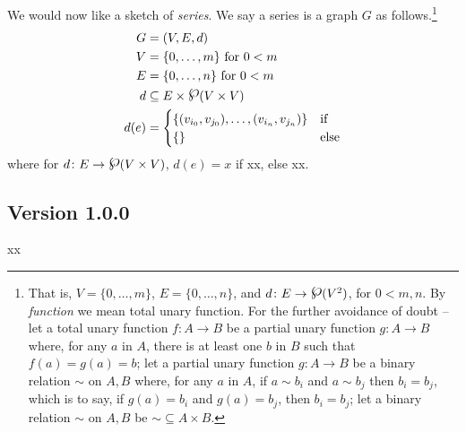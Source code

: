 \documentclass{amsart}%
\newcommand{\mention}[1]{\textit{#1}}%
\newcommand{\simset}{\mathord\sim}%
\newcommand{\powerset}{\raisebox{.15\baselineskip}{\Large\ensuremath{\wp}}}%
\theoremstyle{plain}
\theoremstyle{definition}
\theoremstyle{remark}
\theoremstyle{definition}
\theoremstyle{remark}
\begin{document}
We would now like a sketch of \mention{series}. We say a series is a graph \(G\) as follows.\footnote{That is, \(V=\{0,\ldots,m\}\), \(E=\{0,\ldots,n\}\), and \(d\colon E\to\powerset(V^2)\), for \(0<m,n\). By \mention{function} we mean total unary function. For the further avoidance of doubt -- let a total unary function \(f\colon A\to B\) be a partial unary function \(g\colon A\to B\) where, for any \(a\) in \(A\), there is at least one \(b\) in \(B\) such that \(f(a)=g(a)=b\); let a partial unary function \(g\colon A\to B\) be a binary relation \(\sim\) on \(A,B\) where, for any \(a\) in \(A\), if \(a\sim b_i\) and \(a\sim b_j\) then \(b_i=b_j\), which is to say, if \(g(a)=b_i\) and \(g(a)=b_j\), then \(b_i=b_j\); let a binary relation \(\sim\) on \(A,B\) be \(\simset\subseteq A\times B\).}
\begin{align*}
G &= (V, E, d)\\%
V &= \{0,\ldots,m\}\text{ for } 0<m\\
E &= \{0,\ldots,n\}\text{ for } 0<m\\
d &\subseteq E\times\powerset(V\times V)\\
d(e) &=\begin{cases}
\{(v_{i_0},v_{j_0}),\ldots,(v_{i_n},v_{j_n})\} & \text{if}\\
\{\} & \text{else}
\end{cases}
\end{align*}
where for \(d\colon E\to\powerset(V\times V)\), \(d(e)=x\) if xx, else xx.
%
%
%
\subsection{Version 1.0.0}
\label{ss:ver1}
xx
%
%
%
\end{document}
